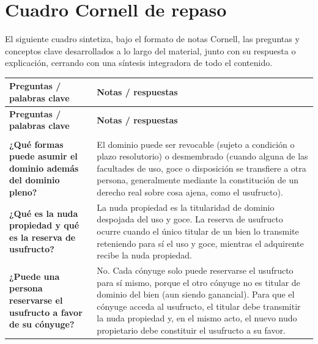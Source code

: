 \documentclass[12pt,oneside]{book}
\begin{document}
\chapter{Cuadro Cornell de repaso}

El siguiente cuadro sintetiza, bajo el formato de notas Cornell, las preguntas y conceptos clave desarrollados a lo largo del material, junto con su respuesta o explicación, cerrando con una síntesis integradora de todo el contenido.

\begin{longtable}{
    >{\raggedright\arraybackslash}p{}
    >{\raggedright\arraybackslash}p{}
}
\toprule
\textbf{Preguntas / palabras clave} & \textbf{Notas / respuestas} \\
\midrule
\endfirsthead

\toprule
\textbf{Preguntas / palabras clave} & \textbf{Notas / respuestas} \\
\midrule
\endhead

\midrule
\multicolumn{2}{r}{\textit{Continúa en la página siguiente}} \\
\endfoot

\bottomrule
\endlastfoot

\textbf{¿Qué formas puede asumir el dominio además del dominio pleno?} &
El dominio puede ser revocable (sujeto a condición o plazo resolutorio) o desmembrado (cuando alguna de las facultades de uso, goce o disposición se transfiere a otra persona, generalmente mediante la constitución de un derecho real sobre cosa ajena, como el usufructo). \\

\textbf{¿Qué es la nuda propiedad y qué es la reserva de usufructo?} &
La nuda propiedad es la titularidad de dominio despojada del uso y goce. La reserva de usufructo ocurre cuando el único titular de un bien lo transmite reteniendo para sí el uso y goce, mientras el adquirente recibe la nuda propiedad. \\

\textbf{¿Puede una persona reservarse el usufructo a favor de su cónyuge?} &
No. Cada cónyuge solo puede reservarse el usufructo para sí mismo, porque el otro cónyuge no es titular de dominio del bien (aun siendo ganancial). Para que el cónyuge acceda al usufructo, el titular debe transmitir la nuda propiedad y, en el mismo acto, el nuevo nudo propietario debe constituir el usufructo a su favor. \\


\end{longtable}
\end{document}
